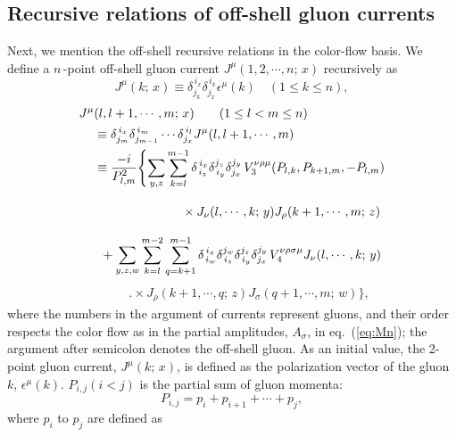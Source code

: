 \subsection{Recursive relations of off-shell gluon currents}
\label{recursive}
Next, we mention the off-shell recursive relations in the color-flow
basis. We define a $n$\,-point off-shell gluon current $J^{\mu}(1, 2,\cdots,n;\,x)$ recursively
as
\begin{equation}
J^{\mu}(k;\,x)\equiv\delta_{j_k}^{\,i_x}\delta_{j_x}^{\,i_k}\epsilon^{\mu}(k)\hspace{1em}(1\leq
 k\leq n),\label{j2}
 \end{equation}
 \begin{align*}
J^{\mu}&(l, l+1,\cdots,m;\,x) \hspace{2em}(1\leq l < m\leq n)\nonumber\\
&\equiv\delta^{\,i_x}_{j_m}\delta^{\,i_m}_{j_{m-1}}\cdots\delta^{\,i_{l}}_{j_x}J^{\mu}(l, l+1,\cdots,m) \nonumber\\
&\equiv\frac{-i}{P^2_{l, m}}\Biggl\{\sum_{y, z}\sum_{k=l}^{m-1}
\delta_{\,i_z}^{\,i_x}\delta_{\,i_y}^{j_z}\delta_{j_x}^{j_y}\,V^{\nu\rho\mu}_3(P_{l, k},P_{k+1, m},-P_{l, m})\nonumber\\
 &\hspace{7em}\times J_{\nu}
(l,\cdots,k;\,y)J_{\rho}(k+1,\cdots,m;\,z)\Biggr.\nonumber\\
&\hspace{0.5em}+\sum_{y, z, w}\sum_{k=l}^{m-2}\sum_{q=k+1}^{m-1}
\delta_{\,i_w}^{\,i_x}\delta_{\,i_z}^{j_w}\delta_{\,i_y}^{j_z}\delta_{j_x}^{j_y}
 \,V^{\nu\rho\sigma\mu}_4J_{\nu}(l, \cdots,k;\,y)\nonumber
\end{align*}
\begin{align}
 &\hspace{2em}\Biggl.\times J_{\rho}(k+1,\cdots,q;\,z)J_{\sigma}(q+1,\cdots,m;\,w)\Biggr\},
\label{eq:off-shell}
\end{align}
where the numbers in the argument of currents represent gluons,
 and their order respects the color flow as in the partial amplitudes,
 $A_{\sigma}$, in eq.~(\ref{eq:Mn}); the argument after semicolon denotes the off-shell gluon. As an initial value, the 2-point gluon current,
 $J^{\mu}(k;\,x)$, is defined as the polarization vector of the gluon $k$,
 $\epsilon^{\mu}(k)$. $P_{i,j} (i<j)$ is the partial sum
 of gluon momenta:
 \begin{equation}
P_{i,j}=p_i+p_{i+1}+\cdots+p_j,
 \end{equation}
where $p_i$ to $p_j$ are defined as
